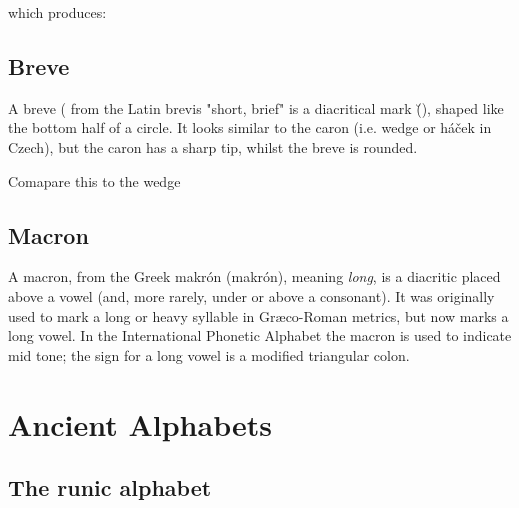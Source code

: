 which produces:

\bigskip
{}
\bigskip



\section*{Breve}
\begin{multicols}{2}
A breve ( from the Latin brevis "short, brief" is a diacritical mark (\u{}), shaped like the bottom half of a circle. It looks similar to the caron (i.e. wedge or h\'a\v{c}ek in Czech), but the caron has a sharp tip, whilst the breve is rounded. 
\end{multicols}

\begin{center}  \end{center}

Comapare this to the wedge

\begin{center}  \end{center}
\begin{center}  \end{center}


\section*{Macron}

A macron, from the Greek \textgreek{makr\'on} (makr\'on), meaning \textit{long}, is a diacritic placed above a vowel (and, more rarely, under or above a consonant). It was originally used to mark a long or heavy syllable in Gr\ae co-Roman metrics, but now marks a long vowel. In the International Phonetic Alphabet the macron is used to indicate mid tone; the sign for a long vowel is a modified triangular colon.

\chapter{Ancient Alphabets}
\section{The runic alphabet}



